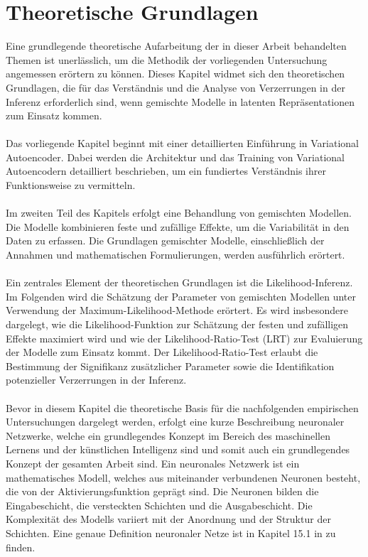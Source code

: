 \documentclass[%
thesis=student,%
coverpage=false,%
titlepage=false,%
headmarks=true, %
german,%
font=libertine, %
math=newpxtx, %
BCOR=5mm,%
coverBCOR=11mm%
]{tumbook}
\theoremstyle{break}
\begin{document}
\chapter{Theoretische Grundlagen}
Eine grundlegende theoretische Aufarbeitung der in dieser Arbeit behandelten Themen ist unerlässlich, um die Methodik der vorliegenden Untersuchung angemessen erörtern zu können.  Dieses Kapitel widmet sich den theoretischen Grundlagen, die für das Verständnis und die Analyse von Verzerrungen in der Inferenz erforderlich sind, wenn gemischte Modelle in latenten Repräsentationen zum Einsatz kommen.\\
\\
Das vorliegende Kapitel beginnt mit einer detaillierten Einführung in Variational Autoencoder. Dabei werden die Architektur und das Training von Variational Autoencodern detailliert beschrieben, um ein fundiertes Verständnis ihrer Funktionsweise zu vermitteln.\\
\\
Im zweiten Teil des Kapitels erfolgt eine Behandlung von gemischten Modellen. Die Modelle kombinieren feste und zufällige Effekte, um die Variabilität in den Daten zu erfassen. Die Grundlagen gemischter Modelle, einschließlich der Annahmen und mathematischen Formulierungen, werden ausführlich erörtert.\\
\\
Ein zentrales Element der theoretischen Grundlagen ist die Likelihood-Inferenz. Im Folgenden wird die Schätzung der Parameter von gemischten Modellen unter Verwendung der Maximum-Likelihood-Methode erörtert. Es wird insbesondere dargelegt, wie die Likelihood-Funktion zur Schätzung der festen und zufälligen Effekte maximiert wird und wie der Likelihood-Ratio-Test (LRT) zur Evaluierung der Modelle zum Einsatz kommt. Der Likelihood-Ratio-Test erlaubt die Bestimmung der Signifikanz zusätzlicher Parameter sowie die Identifikation potenzieller Verzerrungen in der Inferenz.\\
\\
Bevor in diesem Kapitel die theoretische Basis für die nachfolgenden empirischen Untersuchungen dargelegt werden, erfolgt eine kurze Beschreibung neuronaler Netzwerke, welche ein grundlegendes Konzept im Bereich des maschinellen Lernens und der künstlichen Intelligenz sind und somit auch ein grundlegendes Konzept der gesamten Arbeit sind. Ein neuronales Netzwerk ist ein mathematisches Modell, welches aus miteinander verbundenen Neuronen besteht, die von der Aktivierungsfunktion geprägt sind. Die Neuronen bilden die Eingabeschicht, die versteckten Schichten und die Ausgabeschicht. Die Komplexität des Modells variiert mit der Anordnung und der Struktur der Schichten. Eine genaue Definition neuronaler Netze ist in Kapitel 15.1 in \cite{Skript-neuronalesNetz} zu finden.\\
\end{document}
